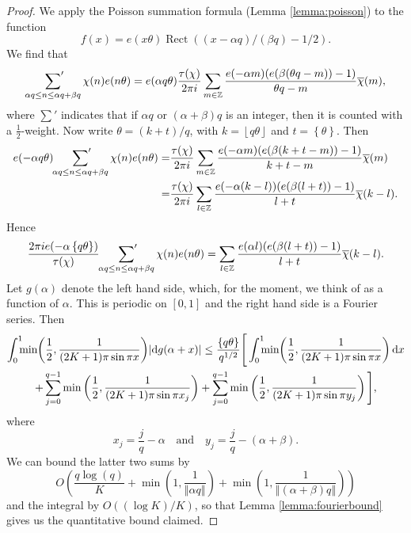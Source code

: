 \documentclass[12pt, a4paper]{amsart}
\theoremstyle{remark}
\DeclareMathOperator{\rect}{Rect}
\newcommand{\Z}{\ensuremath{\mathbb{Z}}}
\newcommand{\ud}{\mathrm{d}}
\newcommand{\dx}{\mathrm{d}x}
\newcommand{\floor}[1]{\left\lfloor#1\right\rfloor}
\newcommand{\frc}[1]{\left\{#1\right\}}
\newcommand{\frcmod}[1]{\left\Vert#1\right\Vert}
\newcommand{\chibar}{\overline \chi}
\begin{document}
\begin{proof}
    We apply the Poisson summation formula (Lemma \ref{lemma:poisson})
    to the function
    \[
        f(x) = e(x\theta) \rect((x-\alpha q)/(\beta q)-1/2).
    \]
    We find that
    \[
        \sideset{}{'}\sum_{\alpha q \le n \le \alpha q + \beta q}\chi(n)e(n\theta)
         = e(\alpha q\theta) \frac{\tau(\chi)}{2\pi i} \sum_{m \in \Z}
        \frac{e(-\alpha m) (e(\beta(\theta q - m)) - 1)}
        {\theta q - m}
        \chibar(m),
    \]
    where $\sum'$ indicates that if $\alpha q$ or $(\alpha+\beta)q$ is an integer, then it is counted with a $\frac{1}{2}$-weight. 
Now write $\theta = (k + t)/q$, with $k = \floor{q\theta}$ and $t = \frc{\theta}$.
Then
\[
\begin{split}
    e(-\alpha q \theta)
    \sideset{}{'}\sum_{\alpha q \le n \le \alpha q + \beta q} \chi(n)e(n\theta)
    =& \frac{\tau(\chi)}{2\pi i} \sum_{m \in \Z}
    \frac{e(-\alpha m) (e(\beta(k + t - m)) - 1)}
    {k + t - m}
    \chibar(m) \\
    =& \frac{\tau(\chi)}{2\pi i} \sum_{l \in \Z}
    \frac{e(-\alpha (k-l)) (e(\beta(l + t)) - 1)}
    {l + t }
    \chibar(k-l).
\end{split}
\]
Hence
\[
    \frac{2 \pi i e(-\alpha\frc{q\theta})}{\tau(\chi)}
    \sideset{}{'}\sum_{\alpha q \le n \le \alpha q + \beta q} \chi(n)e(n\theta)
    = \sum_{l \in \Z}
    \frac{e(\alpha l) (e(\beta(l + t)) - 1)}
    {l + t }
    \chibar(k-l).
\]
Let $g(\alpha)$ denote the left hand side, which, for the moment, we think of
as a function of $\alpha$. This is periodic on $[0,1]$ and the right hand side
is a Fourier series. Then
\begin{multline*}
    \int_0^1 \hspace{-5pt}\min\hspace{-2pt}\bigg(\frac{1}{2}, \frac{1}{(2K + 1)\pi \sin \pi x}\bigg) |\ud g(\alpha + x)|
    \le
    \frac{\frc{q\theta}}{q^{1/2}}\Bigg[\int_0^1 \hspace{-5pt}\min\hspace{-2pt}\left(\frac{1}{2}, \frac{1}{(2K + 1)\pi \sin \pi x}\right) \dx \\
    + \sum_{j=0}^{q-1}\min\left(\frac{1}{2}, \frac{1}{(2K + 1)\pi \sin \pi x_j}\right) 
+ \sum_{j=0}^{q-1}\min\left(\frac{1}{2}, \frac{1}{(2K + 1)\pi \sin \pi y_j}\right)\Bigg],
\end{multline*}
where
\[x_j = \frac{j}{q} - \alpha \ \ \ \textrm{ and }\ \ \ 
y_j = \frac{j}{q} - (\alpha + \beta).\]
We can bound the latter two sums by
\[
    O\left(\frac{q \log(q)}{K} + \min\left(1, \frac{1}{\frcmod{\alpha q}}\right)
    + \min\left(1, \frac{1}{\frcmod{(\alpha + \beta)q}}\right)
    \right)
\]
and the integral by $O((\log K)/K)$, so that Lemma \ref{lemma:fourierbound}
gives us the quantitative bound claimed.
\end{proof}
\end{document}
